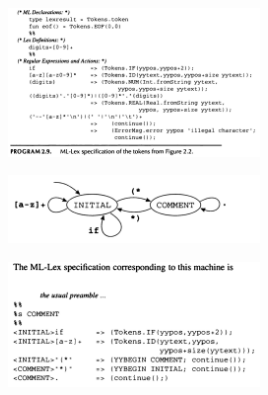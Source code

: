\documentclass[8pt, a4paper, oneside, twocolumn]{extarticle}
\begin{document}
\includegraphics[width=0.5\textwidth,height=0.5\textheight,keepaspectratio]{lex}


\includegraphics[width=0.5\textwidth,height=0.5\textheight,keepaspectratio]{lex3}

\includegraphics[width=0.5\textwidth,height=0.5\textheight,keepaspectratio]{lex4}
\end{document}
